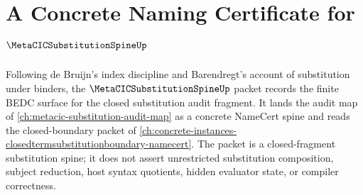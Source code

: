 \chapter{A Concrete Naming Certificate for $\MetaCICSubstitutionSpineUp$}
\label{ch:concrete-instances-metacic-substitution-spine-namecert}

Following de Bruijn's index discipline and Barendregt's account of substitution under binders, the $\MetaCICSubstitutionSpineUp$ packet records the finite BEDC surface for the closed substitution audit fragment. It lands the audit map of \autoref{ch:metacic-substitution-audit-map} as a concrete NameCert spine and reads the closed-boundary packet of \autoref{ch:concrete-instances-closedtermsubstitutionboundary-namecert}. The packet is a closed-fragment substitution spine; it does not assert unrestricted substitution composition, subject reduction, host syntax quotients, hidden evaluator state, or compiler correctness.

